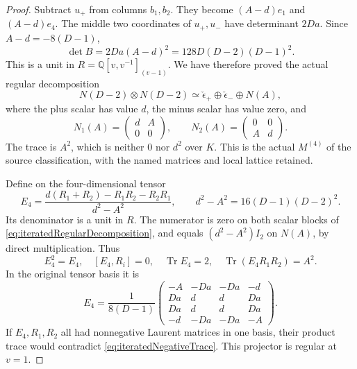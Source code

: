 \documentclass[11pt,a4paper]{article}
\newcommand{\A}{\mathbb A}\newcommand{\PP}{\mathbb P}\newcommand{\GL}{\mathrm{GL}}
\theoremstyle{named}\newtheorem{finding}{Finding}[section]
\theoremstyle{definition}\newtheorem{definition}[finding]{Definition}
\theoremstyle{remark}\newtheorem{remark}[finding]{Remark}
\begin{document}
\begin{proof}
Subtract \(u_+\) from columns \(b_1,b_2\).
They become \((A-d)e_1\) and \((A-d)e_4\).
The middle two coordinates of \(u_+,u_-\) have determinant
\(2Da\). Since \(A-d=-8(D-1)\),
\begin{equation}\label{eq:iteratedRegularDeterminant}
             \det B=2Da(A-d)^2
                    =128D(D-2)(D-1)^2.
\end{equation}
This is a unit in \(R=\mathbb Q[v,v^{-1}]_{(v-1)}\).
We have therefore proved the actual regular decomposition
\begin{equation}\label{eq:iteratedRegularDecomposition}
 N(D-2)\otimes N(D-2)
       \simeq\check\epsilon_+\oplus\check\epsilon_-\oplus N(A),
\end{equation}
where the plus scalar has value \(d\), the minus scalar
has value zero, and
\[
 N_1(A)=\begin{pmatrix}d&A\\0&0\end{pmatrix},\qquad
 N_2(A)=\begin{pmatrix}0&0\\A&d\end{pmatrix}.
\]
The trace is \(A^2\), which is neither \(0\) nor \(d^2\)
over \(K\). This is the actual \(M^{(4)}\) of the source
classification, with the named matrices and local lattice retained.

Define on the four-dimensional tensor
\begin{equation}\label{eq:iteratedMarkedProjector}
 E_4=\frac{d(R_1+R_2)-R_1R_2-R_2R_1}{d^2-A^2},
 \qquad d^2-A^2=16(D-1)(D-2)^2 .
\end{equation}
Its denominator is a unit in \(R\). The numerator is zero
on both scalar blocks of
\eqref{eq:iteratedRegularDecomposition}, and equals
\((d^2-A^2)I_2\) on \(N(A)\), by direct multiplication.
Thus
\[
 E_4^2=E_4,\quad [E_4,R_i]=0,\quad
 \operatorname{Tr}E_4=2,\quad
 \operatorname{Tr}(E_4R_1R_2)=A^2.
\]
In the original tensor basis it is
\[
 E_4=\frac1{8(D-1)}
 \begin{pmatrix}
 -A&-Da&-Da&-d\\
 Da&d&d&Da\\
 Da&d&d&Da\\
 -d&-Da&-Da&-A
 \end{pmatrix}.
\]
If \(E_4,R_1,R_2\) all had nonnegative Laurent matrices in
one basis, their product trace would contradict
\eqref{eq:iteratedNegativeTrace}. This projector is regular
at \(v=1\).


\end{proof}
\end{document}
